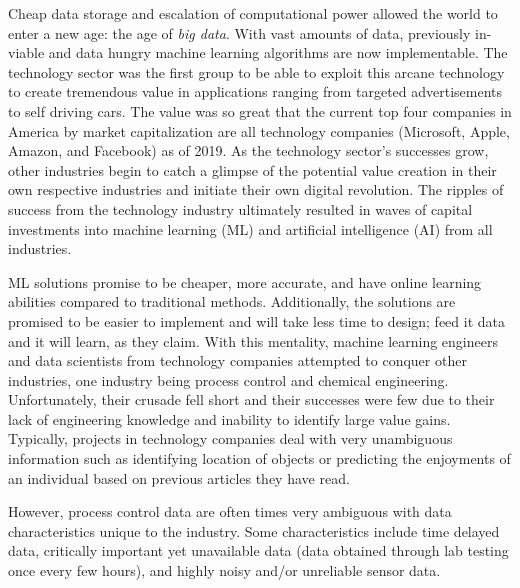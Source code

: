 %
% 

Cheap data storage and escalation of computational power allowed the world to enter a new age: the age of \textit{big data}. With vast amounts of data, previously in-viable and data hungry machine learning algorithms are now implementable.  The technology sector was the first group to be able to exploit this arcane technology to create tremendous value in applications ranging from targeted advertisements to self driving cars. The value was so great that the current top four companies in America by market capitalization are all technology companies (Microsoft, Apple, Amazon, and Facebook) as of 2019. As the technology sector's successes grow, other industries begin to catch a glimpse of the potential value creation in their own respective industries and initiate their own digital revolution. The ripples of success from the technology industry ultimately resulted in waves of capital investments into machine learning (ML) and artificial intelligence (AI) from all industries.

ML solutions promise to be cheaper, more accurate, and have online learning abilities compared to traditional methods.  Additionally, the solutions are promised to be easier to implement and will take less time to design; feed it data and it will learn, as they claim.  With this mentality, machine learning engineers and data scientists from technology companies attempted to conquer other industries, one industry being process control and chemical engineering. Unfortunately, their crusade fell short and their successes were few due to their lack of engineering knowledge and inability to identify large value gains.  Typically, projects in technology companies deal with very unambiguous information such as identifying location of objects or predicting the enjoyments of an individual based on previous articles they have read.

However, process control data are often times very ambiguous with data characteristics unique to the industry. Some characteristics include time delayed data, critically important yet unavailable data (data obtained through lab testing once every few hours), and highly noisy and/or unreliable sensor data.

